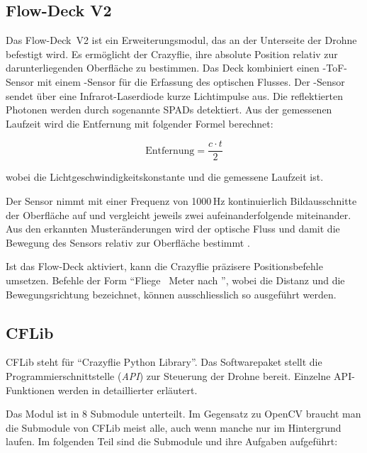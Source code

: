 \subsection{Flow-Deck V2}
\label{sub:v2}

Das Flow-Deck~V2 ist ein Erweiterungsmodul, das an der Unterseite der Drohne befestigt wird.
Es ermöglicht der Crazyflie, ihre absolute Position relativ zur darunterliegenden Oberfläche zu bestimmen.
Das Deck kombiniert einen -ToF-Sensor\footnotemark{} mit einem -Sensor für die Erfassung des optischen Flusses.
Der -Sensor sendet über eine Infrarot-Laserdiode kurze Lichtimpulse aus.
Die reflektierten Photonen werden durch sogenannte SPADs\footnotemark{} detektiert. 
Aus der gemessenen Laufzeit wird die Entfernung mit folgender Formel berechnet:

\[
\text{Entfernung} = \frac{c \cdot t}{2}
\]

wobei  die Lichtgeschwindigkeitskonstante und  die gemessene Laufzeit ist.

Der  Sensor nimmt mit einer Frequenz von 1000\,Hz kontinuierlich Bildausschnitte der Oberfläche auf und vergleicht jeweils zwei aufeinanderfolgende miteinander.
Aus den erkannten Musteränderungen wird der optische Fluss und damit die Bewegung des Sensors relativ zur Oberfläche bestimmt \cite{bc:fdv2_specs}.

Ist das Flow-Deck aktiviert, kann die Crazyflie präzisere Positionsbefehle umsetzen.
Befehle der Form \enquote{Fliege ~Meter nach }, wobei  die Distanz und  die Bewegungsrichtung bezeichnet, können ausschliesslich so ausgeführt werden.

\subsection{CFLib}
\label{sub:cflib}
CFLib steht für \enquote{Crazyflie Python Library}.
Das Softwarepaket stellt die Programmierschnittstelle (\textit{API}) zur Steuerung der Drohne bereit. 
Einzelne API-Funktionen werden in  detaillierter erläutert.

Das Modul ist in 8 Submodule unterteilt.
Im Gegensatz zu OpenCV braucht man die Submodule von CFLib meist alle, auch wenn manche nur im Hintergrund laufen.
Im folgenden Teil sind die Submodule und ihre Aufgaben aufgeführt:

